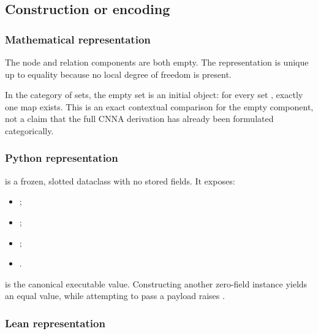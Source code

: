 \subsection{Construction or encoding}\label{construction-or-encoding-2}

\subsubsection{Mathematical
representation}\label{mathematical-representation-2}

The node and relation components are both empty. The representation is
unique up to equality because no local degree of freedom is present.

In the category of sets, the empty set is an initial object: for every
set \texttt{\protect{}}, exactly one map \texttt{\protect{}} exists. This is an
exact contextual comparison for the empty component, not a claim that
the full CNNA derivation has already been formulated categorically.

\subsubsection{Python representation}\label{python-representation-2}

\texttt{\protect{}} is a frozen, slotted dataclass with no stored
fields. It exposes:

\begin{itemize}
\tightlist
\item
  \texttt{\protect{}};
\item
  \texttt{\protect{}};
\item
  \texttt{\protect{}};
\item
  \texttt{\protect{}}.
\end{itemize}

\texttt{\protect{}} is the canonical executable value. Constructing
another zero-field instance yields an equal value, while attempting to
pass a payload raises \texttt{\protect{}}.

\subsubsection{Lean representation}\label{lean-representation-2}

